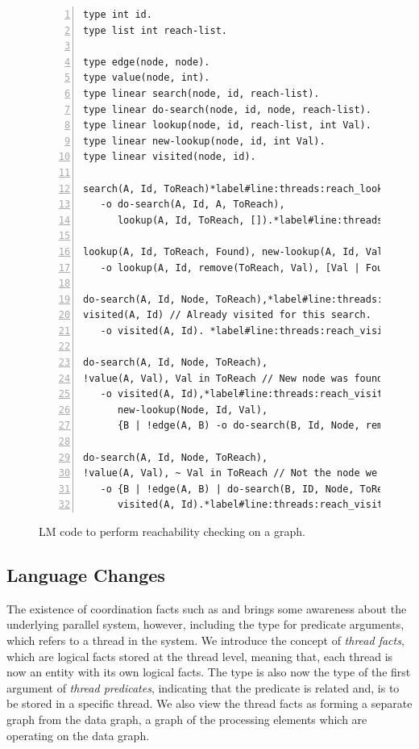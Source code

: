 \begin{figure}[h]
\begin{Verbatim}[numbers=left,fontsize=\codesize,commandchars=*\#\&]
type int id.
type list int reach-list.

type edge(node, node).
type value(node, int).
type linear search(node, id, reach-list).
type linear do-search(node, id, node, reach-list).
type linear lookup(node, id, reach-list, int Val).
type linear new-lookup(node, id, int Val).
type linear visited(node, id).

search(A, Id, ToReach)*label#line:threads:reach_lookup1&
   -o do-search(A, Id, A, ToReach),
      lookup(A, Id, ToReach, []).*label#line:threads:reach_lookup2&

lookup(A, Id, ToReach, Found), new-lookup(A, Id, Val) // New reachable node found.
   -o lookup(A, Id, remove(ToReach, Val), [Val | Found]).

do-search(A, Id, Node, ToReach),*label#line:threads:reach_visit1&
visited(A, Id) // Already visited for this search.
   -o visited(A, Id). *label#line:threads:reach_visit2&

do-search(A, Id, Node, ToReach),
!value(A, Val), Val in ToReach // New node was found.
   -o visited(A, Id),*label#line:threads:reach_visit_visited1&
      new-lookup(Node, Id, Val),
      {B | !edge(A, B) -o do-search(B, Id, Node, remove(ToReach, Val))}.*label#line:threads:reach_propagate&

do-search(A, Id, Node, ToReach),
!value(A, Val), ~ Val in ToReach // Not the node we are looking for.
   -o {B | !edge(A, B) | do-search(B, ID, Node, ToReach)},*label#line:threads:reach_propagate2&
      visited(A, Id).*label#line:threads:reach_visit_visited2&
\end{Verbatim}

\caption{LM code to perform reachability checking on a graph.}
\label{code:threads:reach_simple}
\end{figure}

\subsection{Language Changes}

The existence of coordination facts such as  and
 brings some awareness about the underlying parallel system,
however, including the type  for predicate arguments, which refers
to a thread in the system. We introduce the concept of \emph{thread facts},
which are logical facts stored at the thread level, meaning that, each thread
is now an entity with its own logical facts. The type  is also now
the type of the first argument of \emph{thread predicates}, indicating that the
predicate is related and, is to be stored in a specific thread. We also view
the thread facts as forming a separate graph from the data graph, a graph of
the processing elements which are operating on the data graph.



